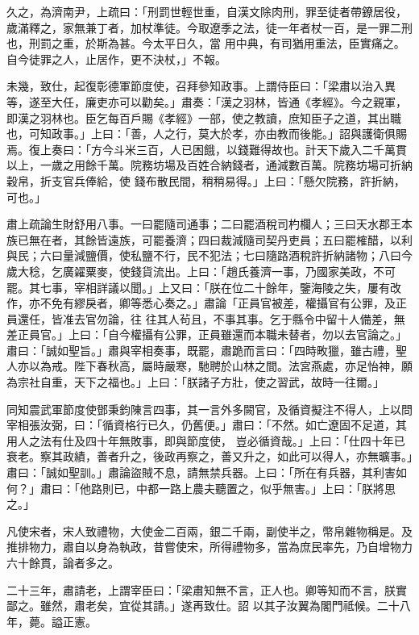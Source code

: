 \begin{pinyinscope}
 久之，為濟南尹，上疏曰：「刑罰世輕世重，自漢文除肉刑，罪至徒者帶鐐居役，歲滿釋之，家無兼丁者，加杖準徒。今取遼季之法，徒一年者杖一百，是一罪二刑也，刑罰之重，於斯為甚。今太平日久，當
 用中典，有司猶用重法，臣實痛之。自今徒罪之人，止居作，更不決杖，」不報。



 未幾，致仕，起復彰德軍節度使，召拜參知政事。上謂侍臣曰：「梁肅以治入異等，遂至大任，廉吏亦可以勸矣。」肅奏：「漢之羽林，皆通《孝經》。今之親軍，即漢之羽林也。臣乞每百戶賜《孝經》一部，使之教讀，庶知臣子之道，其出職也，可知政事。」上曰：「善，人之行，莫大於孝，亦由教而後能。」詔與護衛俱賜焉。復上奏曰：「方今斗米三百，人已困餓，以錢難得故也。計天下歲入二千萬貫以上，一歲之用餘千萬。院務坊場及百姓合納錢者，通減數百萬。院務坊場可折納穀帛，折支官兵俸給，使
 錢布散民間，稍稍易得。」上曰：「懸欠院務，許折納，可也。」



 肅上疏論生財舒用八事。一曰罷隨司通事；二曰罷酒稅司杓欄人；三曰天水郡王本族已無在者，其餘皆遠族，可罷養濟；四曰裁減隨司契丹吏員；五曰罷榷醋，以利與民；六曰量減鹽價，使私鹽不行，民不犯法；七曰隨路酒稅許折納諸物；八曰今歲大稔，乞廣糴粟麥，使錢貨流出。上曰：「趙氏養濟一事，乃國家美政，不可罷。其七事，宰相詳議以聞。」上又曰：「朕在位二十餘年，鑒海陵之失，屢有改作，亦不免有繆戾者，卿等悉心奏之。」肅論「正員官被差，權攝官有公罪，及正員還任，皆准去官勿論，往
 往其人茍且，不事其事。乞于縣令中留十人備差，無差正員官。」上曰：「自今權攝有公罪，正員雖還而本職未替者，勿以去官論之。」肅曰：「誠如聖旨。」肅與宰相奏事，既罷，肅跪而言曰：「四時畋獵，雖古禮，聖人亦以為戒。陛下春秋高，屬時嚴寒，馳聘於山林之間。法宮燕處，亦足怡神，願為宗社自重，天下之福也。」上曰：「朕諸子方壯，使之習武，故時一往爾。」



 同知震武軍節度使鄧秉鈞陳言四事，其一言外多闕官，及循資擬注不得人，上以問宰相張汝弼，曰：「循資格行已久，仍舊便。」肅曰：「不然。如亡遼固不足道，其用人之法有仕及四十年無敗事，即與節度使，
 豈必循資哉。」上曰：「仕四十年已衰老。察其政績，善者升之，後政再察之，善又升之，如此可以得人，亦無曠事。」肅曰：「誠如聖訓。」肅論盜賊不息，請無禁兵器。上曰：「所在有兵器，其利害如何？」肅曰：「他路則已，中都一路上農夫聽置之，似乎無害。」上曰：「朕將思之。」



 凡使宋者，宋人致禮物，大使金二百兩，銀二千兩，副使半之，幣帛雜物稱是。及推排物力，肅自以身為執政，昔嘗使宋，所得禮物多，當為庶民率先，乃自增物力六十餘貫，論者多之。



 二十三年，肅請老，上謂宰臣曰：「梁肅知無不言，正人也。卿等知而不言，朕實鄙之。雖然，肅老矣，宜從其請。」遂再致仕。詔
 以其子汝翼為閣門祗候。二十八年，薨。謚正憲。




\end{pinyinscope}
